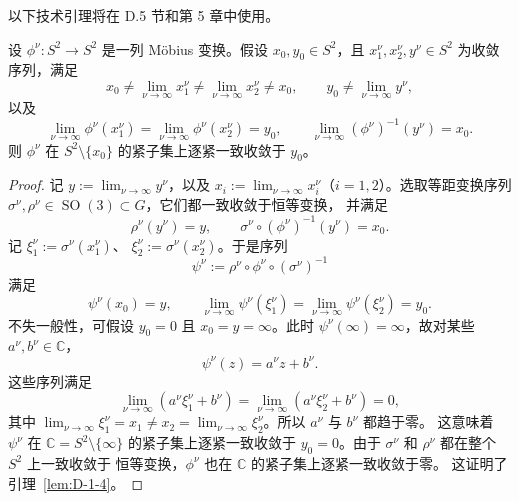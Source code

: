 以下技术引理将在 D.5 节和第 5 章中使用。

\begin{lemma}\label{lem:D-1-4}
设 $\phi^\nu:S^2\to S^2$ 是一列 Möbius 变换。假设
$x_0,y_0\in S^2$，且 $x_1^\nu,x_2^\nu,y^\nu\in S^2$
为收敛序列，满足
\[
  x_0\ne\lim_{\nu\to\infty}x_1^\nu
  \ne\lim_{\nu\to\infty}x_2^\nu\ne x_0,
  \qquad y_0\ne\lim_{\nu\to\infty}y^\nu,
\]
以及
\[
  \lim_{\nu\to\infty}\phi^\nu(x_1^\nu)
  =\lim_{\nu\to\infty}\phi^\nu(x_2^\nu)=y_0,
  \qquad
  \lim_{\nu\to\infty}(\phi^\nu)^{-1}(y^\nu)=x_0.
\]
则 $\phi^\nu$ 在 $S^2\setminus\{x_0\}$ 的紧子集上逐紧一致收敛于 $y_0$。
\end{lemma}
\begin{proof}
记 $y:=\lim_{\nu\to\infty}y^\nu$，以及
$x_i:=\lim_{\nu\to\infty}x_i^\nu$（$i=1,2$）。选取等距变换序列
$\sigma^\nu,\rho^\nu\in\operatorname{SO}(3)\subset G$，它们都一致收敛于恒等变换，
并满足
\[
  \rho^\nu(y^\nu)=y,\qquad
  \sigma^\nu\circ(\phi^\nu)^{-1}(y^\nu)=x_0.
\]
记 $\xi_1^\nu:=\sigma^\nu(x_1^\nu)$、
$\xi_2^\nu:=\sigma^\nu(x_2^\nu)$。于是序列
\[
  \psi^\nu:=\rho^\nu\circ\phi^\nu\circ(\sigma^\nu)^{-1}
\]
满足
\[
  \psi^\nu(x_0)=y,\qquad
  \lim_{\nu\to\infty}\psi^\nu(\xi_1^\nu)
  =\lim_{\nu\to\infty}\psi^\nu(\xi_2^\nu)=y_0.
\]
不失一般性，可假设 $y_0=0$ 且 $x_0=y=\infty$。此时
$\psi^\nu(\infty)=\infty$，故对某些 $a^\nu,b^\nu\in\mathbb C$，
\[
  \psi^\nu(z)=a^\nu z+b^\nu.
\]
这些序列满足
\[
  \lim_{\nu\to\infty}(a^\nu\xi_1^\nu+b^\nu)
  =\lim_{\nu\to\infty}(a^\nu\xi_2^\nu+b^\nu)=0,
\]
其中 $\lim_{\nu\to\infty}\xi_1^\nu=x_1\ne x_2
=\lim_{\nu\to\infty}\xi_2^\nu$。所以 $a^\nu$ 与 $b^\nu$ 都趋于零。
这意味着 $\psi^\nu$ 在
$\mathbb C=S^2\setminus\{\infty\}$ 的紧子集上逐紧一致收敛于
$y_0=0$。由于 $\sigma^\nu$ 和 $\rho^\nu$ 都在整个 $S^2$ 上一致收敛于
恒等变换，$\phi^\nu$ 也在 $\mathbb C$ 的紧子集上逐紧一致收敛于零。
这证明了引理~\ref{lem:D-1-4}。
\end{proof}
